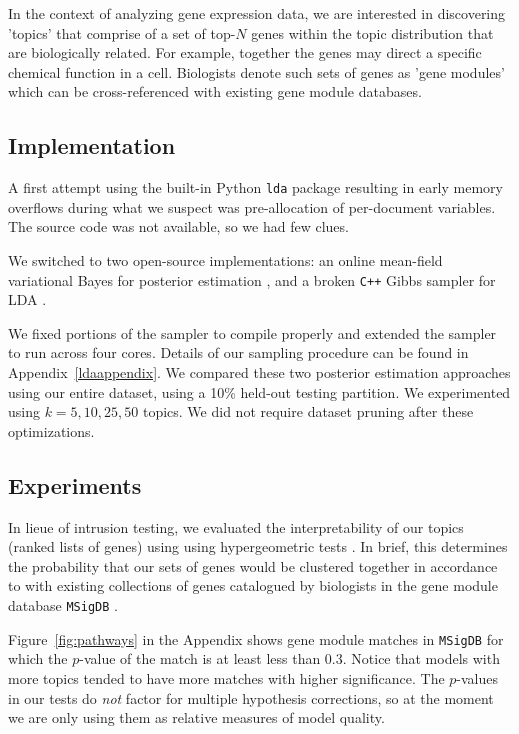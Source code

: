 \documentclass{article}
\begin{document}
In the context of analyzing gene expression data, we are interested in discovering 'topics' that comprise of a set of top-$N$ genes within the topic distribution that are biologically related. For example, together the genes may direct a specific chemical function in a cell. Biologists denote such sets of genes as 'gene modules' which can be cross-referenced with existing gene module databases.

\subsection{Implementation} 
A first attempt using the built-in Python \texttt{lda} package resulting in early memory overflows during what we suspect was pre-allocation of per-document variables. The source code was not available, so we had few clues.

We switched to two open-source implementations: an online mean-field variational Bayes for posterior estimation \cite{ovb}, and a broken \texttt{C++} Gibbs sampler for LDA \cite{plda}. 

\nocite{online}

We fixed portions of the sampler to compile properly and extended the sampler to run across four cores. Details of our sampling procedure can be found in Appendix~\ref{ldaappendix}. We compared these two posterior estimation approaches using our entire dataset, using a 10\% held-out testing partition. We experimented using $k=5, 10, 25, 50$ topics. We did not require dataset pruning after these optimizations.

\subsection{Experiments} 
In lieue of intrusion testing, we evaluated the interpretability of our topics (ranked lists of genes) using using hypergeometric tests \cite{hg}. In brief, this determines the probability that our sets of genes would be clustered together in accordance to with existing collections of genes catalogued by biologists in the gene module database \texttt{MSigDB} \cite{msigdb}.

Figure~\ref{fig:pathways} in the Appendix shows gene module matches in \texttt{MSigDB} for which the $p$-value of the match is at least less than 0.3. Notice that models with more topics tended to have more matches with higher significance. The $p$-values in our tests do \textit{not} factor for multiple hypothesis corrections, so at the moment we are only using them as relative measures of model quality.
\end{document}
